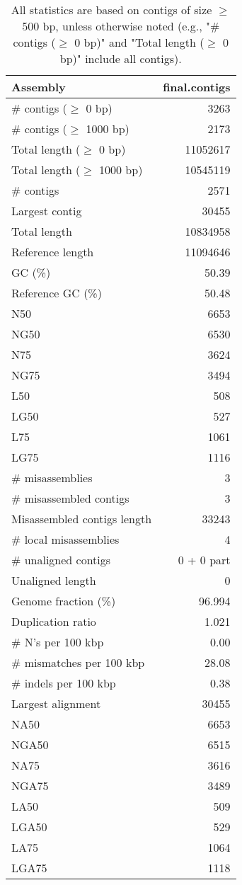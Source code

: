 \documentclass[12pt,a4paper]{article}
\begin{document}
\begin{table}[ht]
\begin{center}
\caption{All statistics are based on contigs of size $\geq$ 500 bp, unless otherwise noted (e.g., "\# contigs ($\geq$ 0 bp)" and "Total length ($\geq$ 0 bp)" include all contigs).}
\begin{tabular}{|l*{1}{|r}|}
\hline
Assembly & final.contigs \\ \hline
\# contigs ($\geq$ 0 bp) & 3263 \\ \hline
\# contigs ($\geq$ 1000 bp) & 2173 \\ \hline
Total length ($\geq$ 0 bp) & 11052617 \\ \hline
Total length ($\geq$ 1000 bp) & 10545119 \\ \hline
\# contigs & 2571 \\ \hline
Largest contig & 30455 \\ \hline
Total length & 10834958 \\ \hline
Reference length & 11094646 \\ \hline
GC (\%) & 50.39 \\ \hline
Reference GC (\%) & 50.48 \\ \hline
N50 & 6653 \\ \hline
NG50 & 6530 \\ \hline
N75 & 3624 \\ \hline
NG75 & 3494 \\ \hline
L50 & 508 \\ \hline
LG50 & 527 \\ \hline
L75 & 1061 \\ \hline
LG75 & 1116 \\ \hline
\# misassemblies & 3 \\ \hline
\# misassembled contigs & 3 \\ \hline
Misassembled contigs length & 33243 \\ \hline
\# local misassemblies & 4 \\ \hline
\# unaligned contigs & 0 + 0 part \\ \hline
Unaligned length & 0 \\ \hline
Genome fraction (\%) & 96.994 \\ \hline
Duplication ratio & 1.021 \\ \hline
\# N's per 100 kbp & 0.00 \\ \hline
\# mismatches per 100 kbp & 28.08 \\ \hline
\# indels per 100 kbp & 0.38 \\ \hline
Largest alignment & 30455 \\ \hline
NA50 & 6653 \\ \hline
NGA50 & 6515 \\ \hline
NA75 & 3616 \\ \hline
NGA75 & 3489 \\ \hline
LA50 & 509 \\ \hline
LGA50 & 529 \\ \hline
LA75 & 1064 \\ \hline
LGA75 & 1118 \\ \hline
\end{tabular}
\end{center}
\end{table}
\end{document}
